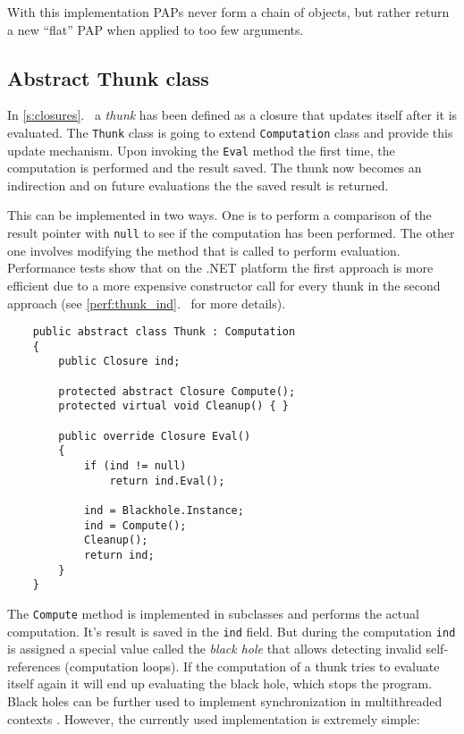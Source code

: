 \documentclass[en]{pracamgr}
\newcommand{\myref}[1]{\ref{#1}.~\textit{\nameref{#1}}}
\begin{document}
With this implementation PAPs never form a chain of objects, but rather return a new ``flat'' PAP when applied to too few arguments.

\subsection{Abstract Thunk class}\label{s:thunk_class}

In \myref{s:closures} a \textit{thunk} has been defined as a
closure that updates itself after it is evaluated.
The \texttt{Thunk} class is going to extend
\texttt{Computation} class and provide this update
mechanism. Upon invoking the \texttt{Eval} method the first
time, the computation is performed and the result saved.
The thunk now becomes an indirection and on future evaluations
the the saved result is returned.

This can be implemented in two ways. One is to perform a comparison
of the result pointer with \texttt{null} to see if
the computation has been performed.
The other one involves modifying the method that is called
to perform evaluation.
Performance tests show that on the .NET platform the first approach is more efficient
due to a more expensive constructor call for every thunk
in the second approach
(see \myref{perf:thunk_ind} for more details).

\begin{verbatim}
    public abstract class Thunk : Computation
    {
        public Closure ind;

        protected abstract Closure Compute();
        protected virtual void Cleanup() { }
        
        public override Closure Eval()
        {
            if (ind != null) 
                return ind.Eval();

            ind = Blackhole.Instance;
            ind = Compute();
            Cleanup();
            return ind;
        }
    }
\end{verbatim}

The \texttt{Compute} method is implemented in subclasses
and performs the actual computation.
It's result is saved in the \texttt{ind} field.
But during the computation \texttt{ind} is assigned a special
value called the \textit{black hole} that allows detecting
invalid self-references (computation loops).
If the computation of a thunk tries to evaluate itself
again it will end up evaluating the black hole, which stops
the program. Black holes can
be further used to implement synchronization in
multithreaded contexts \cite{multiprocessor}.
However, the currently used implementation is extremely simple:
\end{document}
